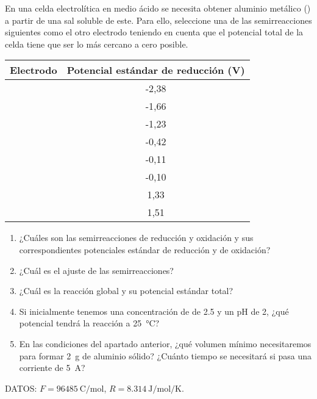 En una celda electrolítica en medio ácido se necesita obtener aluminio metálico () a partir de una sal soluble de este. Para ello, seleccione una de las semirreacciones siguientes como el otro electrodo teniendo en cuenta que el potencial total de la celda tiene que ser lo más cercano a cero posible.
{\normalsize
	\begin{center}
		\begin{tabular}{cS}
			\toprule
				Electrodo					&	{Potencial estándar de reducción (\si{\volt})}	\\
			\midrule
						&	-2,38 											\\
				 		&	-1,66											\\
				 		&	-1,23											\\
					&	-0,42 											\\
							&	-0,11											\\
							&	-0,10											\\
					&	 1,33											\\
						&	 1,51											\\
			\bottomrule
		\end{tabular}
	\end{center}
}
\begin{enumerate}[label={\alph*)},font={\color{red!50!black}\bfseries}]
	\item ¿Cuáles son las semirreacciones de reducción y oxidación y sus correspondientes potenciales estándar de reducción y de oxidación? 
	\item ¿Cuál es el ajuste de las semirreacciones? 
	\item ¿Cuál es la reacción global y su potencial estándar total?
	\item Si inicialmente tenemos una concentración de  de \SI{2,5}{\Molar} y un pH de \num{2}, ¿qué potencial tendrá la reacción a \SI{25}{\celsius}?
	\item En las condiciones del apartado anterior, ¿qué volumen mínimo necesitaremos para formar \SI{2}{\gram} de aluminio sólido? ¿Cuánto tiempo se necesitará si pasa una corriente de \SI{5}{\ampere}?
\end{enumerate}
DATOS: $F = \SI{96485}{\coulomb\per\mol}$, $R = \SI{8,314}{\joule\per\mol\per\kelvin}$.
